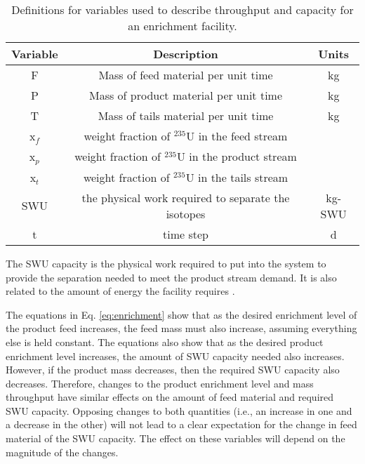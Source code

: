 \begin{table}
    \centering
    \caption{Definitions for variables used to describe throughput and 
    capacity for an enrichment facility.}
    \label{tab:enrichment_variables}
    \begin{tabular}{c c c}
        \hline
        Variable & Description & Units\\\hline
        F & Mass of feed material per unit time & kg\\
        P & Mass of product material per unit time & kg \\
        T & Mass of tails material per unit time & kg\\
        x$_f$ & weight fraction of $^{235}$U in the feed stream &\\
        x$_p$ & weight fraction of $^{235}$U in the product stream & \\
        x$_t$ & weight fraction of $^{235}$U in the tails stream & \\
        \gls{SWU} & the physical work required to separate the isotopes & kg-SWU\\
        t & time step & d\\
        \hline
    \end{tabular}
\end{table}

\noindent The \acrfull{SWU} capacity 
is the physical work required to put into the system to provide the 
separation needed to meet the product stream demand. It is also related 
to the amount of energy the facility 
requires \cite{tsoulfanidis_nuclear_2013}. 

The equations in Eq. \ref{eq:enrichment} show that as the desired enrichment level 
of the product feed increases, the feed mass must also increase, assuming everything 
else is held constant. The equations also show that as the desired 
product 
enrichment level increases, the amount of \gls{SWU} capacity needed also increases. 
However, if the product mass decreases, then the required \gls{SWU} capacity 
also decreases. Therefore, changes to the product enrichment level and mass 
throughput have similar effects on the amount of feed material and required 
\gls{SWU} capacity. Opposing changes to both quantities 
(i.e., an increase in one and a decrease in the other) will not lead to a clear 
expectation for the change in feed material of the \gls{SWU} capacity. 
The effect on these variables will depend on the magnitude of the changes.

